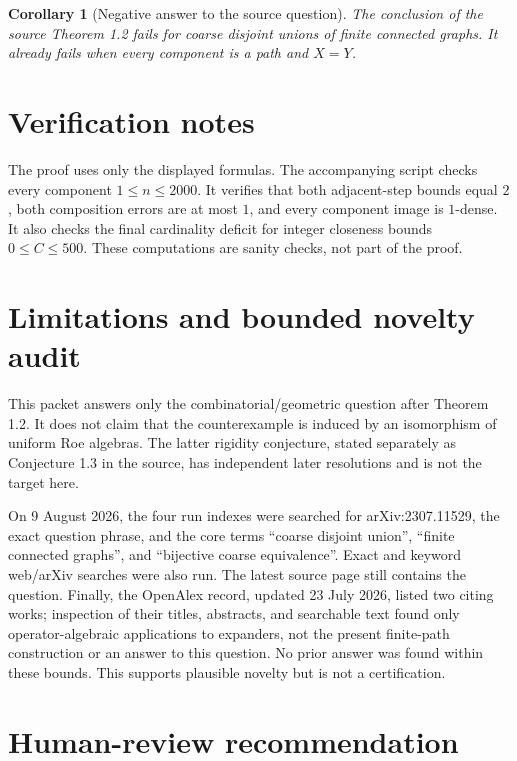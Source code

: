 \documentclass[11pt]{article}
\newtheorem{corollary}[theorem]{Corollary}
\begin{document}
\begin{corollary}[Negative answer to the source question]
The conclusion of the source Theorem 1.2 fails for coarse disjoint unions of
finite connected graphs.  It already fails when every component is a path and
$X=Y$.
\end{corollary}

\section{Verification notes}

The proof uses only the displayed formulas.  The accompanying script
 checks every component
$1\leq n\leq2000$.  It verifies that both adjacent-step bounds equal $2$,
both composition errors are at most $1$, and every component image is
$1$-dense.  It also checks the final cardinality deficit for integer closeness
bounds $0\leq C\leq500$.  These computations are sanity checks, not part of
the proof.

\section{Limitations and bounded novelty audit}

This packet answers only the combinatorial/geometric question after Theorem
1.2.  It does not claim that the counterexample is induced by an isomorphism
of uniform Roe algebras.  The latter rigidity conjecture, stated separately
as Conjecture 1.3 in the source, has independent later resolutions and is not
the target here.

On 9 August 2026, the four run indexes were searched for arXiv:2307.11529,
the exact question phrase, and the core terms ``coarse disjoint union'',
``finite connected graphs'', and ``bijective coarse equivalence''.  Exact and
keyword web/arXiv searches were also run.  The latest source page still
contains the question.  Finally, the OpenAlex record, updated 23 July 2026,
listed two citing works; inspection of their titles, abstracts, and searchable
text found only operator-algebraic applications to expanders, not the present
finite-path construction or an answer to this question.  No prior answer was
found within these bounds.  This supports plausible novelty but is not a
certification.

\section{Human-review recommendation}
\end{document}
